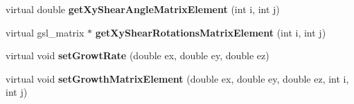\begin{DoxyCompactItemize}
\item 
\hypertarget{classGrowthFunctionBase_adfa5e38c1b2d748c035a3bdbe8717d73}{}virtual double {\bfseries get\+Xy\+Shear\+Angle\+Matrix\+Element} (int i, int j)\label{classGrowthFunctionBase_adfa5e38c1b2d748c035a3bdbe8717d73}

\item 
\hypertarget{classGrowthFunctionBase_a70f43b1e57d2be8ca0e2a937da333dfa}{}virtual gsl\+\_\+matrix $\ast$ {\bfseries get\+Xy\+Shear\+Rotations\+Matrix\+Element} (int i, int j)\label{classGrowthFunctionBase_a70f43b1e57d2be8ca0e2a937da333dfa}

\item 
\hypertarget{classGrowthFunctionBase_abcfbd2e1fbad91b3f9002ef7fc7625e5}{}virtual void {\bfseries set\+Growt\+Rate} (double ex, double ey, double ez)\label{classGrowthFunctionBase_abcfbd2e1fbad91b3f9002ef7fc7625e5}

\item 
\hypertarget{classGrowthFunctionBase_a29781080624a8ab028af36f3326b6240}{}virtual void {\bfseries set\+Growth\+Matrix\+Element} (double ex, double ey, double ez, int i, int j)\label{classGrowthFunctionBase_a29781080624a8ab028af36f3326b6240}

\end{DoxyCompactItemize}
